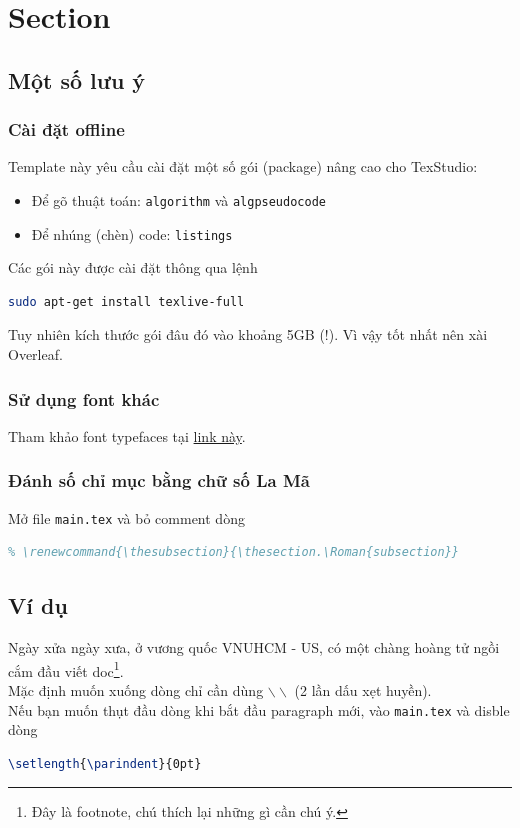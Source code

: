 \section{Section}

\subsection{Một số lưu ý}

\subsubsection{Cài đặt offline}
Template này yêu cầu cài đặt một số gói (package) nâng cao cho TexStudio:
\begin{itemize}
	\item Để gõ thuật toán: \texttt{algorithm} và \texttt{algpseudocode}
	\item Để nhúng (chèn) code: \texttt{listings}
\end{itemize}
Các gói này được cài đặt thông qua lệnh
\begin{lstlisting}[language=sh]
sudo apt-get install texlive-full
\end{lstlisting}
Tuy nhiên kích thước gói đâu đó vào khoảng 5GB (!). Vì vậy tốt nhất nên xài Overleaf.

\subsubsection{Sử dụng font khác}
Tham khảo font typefaces tại \href{https://www.overleaf.com/learn/latex/Font_typefaces}{link này}.

\subsubsection{Đánh số chỉ mục bằng chữ số La Mã}
Mở file \texttt{main.tex} và bỏ comment dòng
\begin{lstlisting}[language=tex]
% \renewcommand{\thesection}{\Roman{section}}
% \renewcommand{\thesubsection}{\thesection.\Roman{subsection}}  
\end{lstlisting}

\subsection{Ví dụ}
Ngày xửa ngày xưa, ở vương quốc VNUHCM - US, có một chàng hoàng tử ngồi cắm đầu viết doc\footnote{Đây là footnote, chú thích lại những gì cần chú ý.}.\\
Mặc định muốn xuống dòng chỉ cần dùng $\backslash\backslash$  (2 lần dấu xẹt huyền).\\
Nếu bạn muốn thụt đầu dòng khi bắt đầu paragraph mới, vào \texttt{main.tex} và disble dòng
\begin{lstlisting}[language=tex]
\setlength{\parindent}{0pt}
\end{lstlisting}

